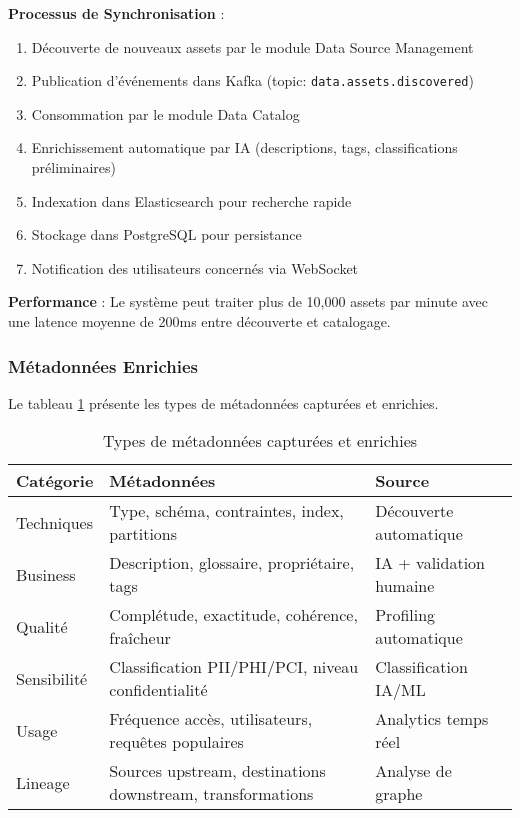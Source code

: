 \textbf{Processus de Synchronisation} :
\begin{enumerate}
    \item Découverte de nouveaux assets par le module Data Source Management
    \item Publication d'événements dans Kafka (topic: \texttt{data.assets.discovered})
    \item Consommation par le module Data Catalog
    \item Enrichissement automatique par IA (descriptions, tags, classifications préliminaires)
    \item Indexation dans Elasticsearch pour recherche rapide
    \item Stockage dans PostgreSQL pour persistance
    \item Notification des utilisateurs concernés via WebSocket
\end{enumerate}

\textbf{Performance} : Le système peut traiter plus de 10,000 assets par minute avec une latence moyenne de 200ms entre découverte et catalogage.

\subsubsection{Métadonnées Enrichies}

Le tableau \ref{tab:types_metadonnees} présente les types de métadonnées capturées et enrichies.

\begin{table}[htpb]
\centering
\caption{Types de métadonnées capturées et enrichies}
\label{tab:types_metadonnees}
\begin{tabular}{|p{}|p{}|p{}|}
\hline
\textbf{Catégorie} & \textbf{Métadonnées} & \textbf{Source} \\
\hline
Techniques & Type, schéma, contraintes, index, partitions & Découverte automatique \\
\hline
Business & Description, glossaire, propriétaire, tags & IA + validation humaine \\
\hline
Qualité & Complétude, exactitude, cohérence, fraîcheur & Profiling automatique \\
\hline
Sensibilité & Classification PII/PHI/PCI, niveau confidentialité & Classification IA/ML \\
\hline
Usage & Fréquence accès, utilisateurs, requêtes populaires & Analytics temps réel \\
\hline
Lineage & Sources upstream, destinations downstream, transformations & Analyse de graphe \\
\hline
\end{tabular}
\end{table}

